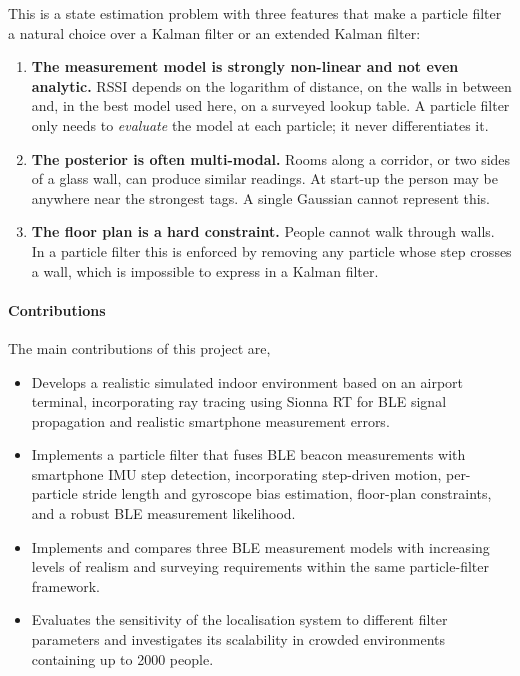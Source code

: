 \documentclass[11pt,a4paper]{article}
\begin{document}
This is a state estimation problem with three features that make a particle filter a
natural choice over a Kalman filter or an extended Kalman filter:
\begin{enumerate}
  \item \textbf{The measurement model is strongly non-linear and not even analytic.}
        RSSI depends on the logarithm of distance, on the walls in between and, in the
        best model used here, on a surveyed lookup table. A particle filter only needs to
        \emph{evaluate} the model at each particle; it never differentiates it.
  \item \textbf{The posterior is often multi-modal.} Rooms along a corridor, or two
        sides of a glass wall, can produce similar readings. At start-up the person may be
        anywhere near the strongest tags. A single Gaussian cannot represent this.
  \item \textbf{The floor plan is a hard constraint.} People cannot walk through walls.
        In a particle filter this is enforced by removing any particle whose step
        crosses a wall, which is impossible to express in a Kalman filter.
\end{enumerate}

\paragraph{Contributions}
The main contributions of this project are,
\begin{itemize}
    \item Develops a realistic simulated indoor environment based on an airport terminal, incorporating ray tracing using Sionna RT for BLE signal propagation and realistic smartphone measurement errors.

    \item Implements a particle filter that fuses BLE beacon measurements with smartphone IMU step detection, incorporating step-driven motion, per-particle stride length and gyroscope bias estimation, floor-plan constraints, and a robust BLE measurement likelihood.

    \item Implements and compares three BLE measurement models with increasing levels of realism and surveying requirements within the same particle-filter framework.

    \item Evaluates the sensitivity of the localisation system to different filter parameters and investigates its scalability in crowded environments containing up to 2000 people.
\end{itemize}
\end{document}
